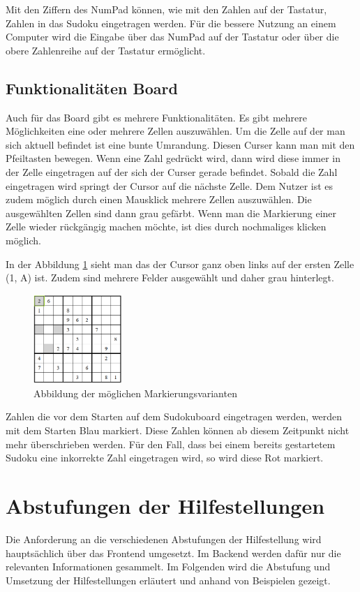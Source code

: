 Mit den Ziffern des NumPad können, wie mit den Zahlen auf der Tastatur, Zahlen in das Sudoku eingetragen werden. Für die bessere Nutzung an einem Computer wird die Eingabe über das NumPad auf der Tastatur oder über die obere Zahlenreihe auf der Tastatur ermöglicht.

\subsection{Funktionalitäten Board}
Auch für das Board gibt es mehrere Funktionalitäten. Es gibt mehrere Möglichkeiten eine oder mehrere Zellen auszuwählen. Um die Zelle auf der man sich aktuell befindet ist eine bunte Umrandung. Diesen Curser kann man mit den Pfeiltasten bewegen. Wenn eine Zahl gedrückt wird, dann wird diese immer in der Zelle eingetragen auf der sich der Curser gerade befindet. Sobald die Zahl eingetragen wird springt der Cursor auf die nächste Zelle. Dem Nutzer ist es zudem möglich durch einen Mausklick mehrere Zellen auszuwählen. Die ausgewählten Zellen sind dann grau gefärbt. Wenn man die Markierung einer Zelle wieder rückgängig machen möchte, ist dies durch nochmaliges klicken möglich. 

In der Abbildung \ref{fig:Markierungen} sieht man das der Cursor ganz oben links auf der ersten Zelle (1, A) ist. Zudem sind mehrere Felder ausgewählt und daher grau hinterlegt.

\begin{figure}[htbp]
	\centering
	\includegraphics[width=0.3\textwidth]{images/Markierungen.png}
	\caption{Abbildung der möglichen Markierungsvarianten}
	\label{fig:Markierungen}
\end{figure}

Zahlen die vor dem Starten auf dem Sudokuboard eingetragen werden, werden mit dem Starten Blau markiert. Diese Zahlen können ab diesem Zeitpunkt nicht mehr überschrieben werden. Für den Fall, dass bei einem bereits gestartetem Sudoku eine inkorrekte Zahl eingetragen wird, so wird diese Rot markiert.


\section{Abstufungen der Hilfestellungen}\label{Abstufung}
Die Anforderung an die verschiedenen Abstufungen der Hilfestellung wird hauptsächlich über das Frontend umgesetzt. Im Backend werden dafür nur die relevanten Informationen gesammelt. Im Folgenden wird die Abstufung und Umsetzung der Hilfestellungen erläutert und anhand von Beispielen gezeigt.

